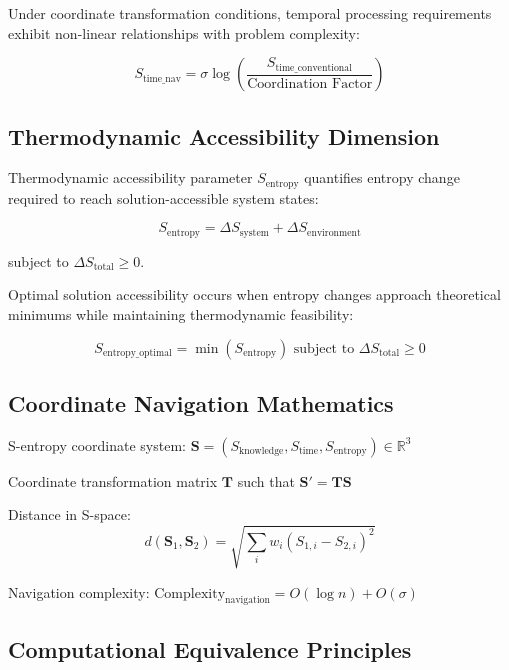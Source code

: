 \documentclass[12pt,a4paper]{article}
\begin{document}
Under coordinate transformation conditions, temporal processing requirements exhibit non-linear relationships with problem complexity:

\begin{equation}
S_{\text{time\_nav}} = \sigma \log\left(\frac{S_{\text{time\_conventional}}}{\text{Coordination Factor}}\right)
\end{equation}

\subsection{Thermodynamic Accessibility Dimension}

Thermodynamic accessibility parameter $S_{\text{entropy}}$ quantifies entropy change required to reach solution-accessible system states:

\begin{equation}
S_{\text{entropy}} = \Delta S_{\text{system}} + \Delta S_{\text{environment}}
\end{equation}

subject to $\Delta S_{\text{total}} \geq 0$.

Optimal solution accessibility occurs when entropy changes approach theoretical minimums while maintaining thermodynamic feasibility:

\begin{equation}
S_{\text{entropy\_optimal}} = \min\left(S_{\text{entropy}}\right) \text{ subject to } \Delta S_{\text{total}} \geq 0
\end{equation}

\subsection{Coordinate Navigation Mathematics}

S-entropy coordinate system: $\mathbf{S} = (S_{\text{knowledge}}, S_{\text{time}}, S_{\text{entropy}}) \in \mathbb{R}^3$

Coordinate transformation matrix $\mathbf{T}$ such that $\mathbf{S}' = \mathbf{T} \mathbf{S}$

Distance in S-space:
\begin{equation}
d(\mathbf{S}_1, \mathbf{S}_2) = \sqrt{\sum_{i} w_i (S_{1,i} - S_{2,i})^2}
\end{equation}

Navigation complexity: $\text{Complexity}_{\text{navigation}} = O(\log n) + O(\sigma)$

\subsection{Computational Equivalence Principles}
\end{document}
